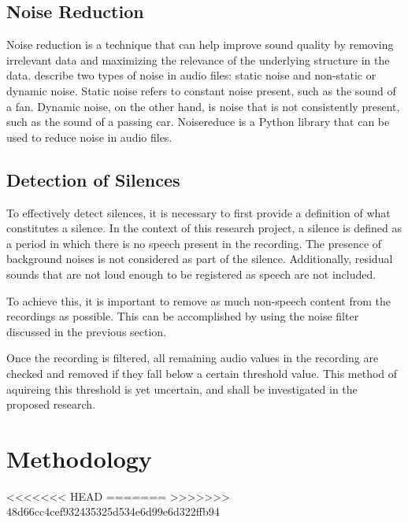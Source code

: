\documentclass[english]{hogent-article}
\begin{document}
\subsection{Noise Reduction}
Noise reduction is a technique that can help improve sound quality by removing irrelevant data and maximizing the relevance of the underlying structure in the data.
\cite{Sainburg_2021} describe two types of noise in audio files: static noise and non-static or dynamic noise.
Static noise refers to constant noise present, such as the sound of a fan.
Dynamic noise, on the other hand, is noise that is not consistently present, such as the sound of a passing car.
Noisereduce \autocite{Sainburg2022} is a Python library that can be used to reduce noise in audio files.

\subsection{Detection of Silences}
\label{subsec:detection-of-silences}

To effectively detect silences, it is necessary to first provide a definition of what constitutes a silence.
In the context of this research project, a silence is defined as a period in which there is no speech present in the recording.
The presence of background noises is not considered as part of the silence.
Additionally, residual sounds that are not loud enough to be registered as speech are not included.

\medskip

To achieve this, it is important to remove as much non-speech content from the recordings as possible.
This can be accomplished by using the noise filter discussed in the previous section.

\medskip

Once the recording is filtered, all remaining audio values in the recording are checked and removed if they fall below a certain threshold value.
This method of aquireing this threshold is yet uncertain, and shall be investigated in the proposed research.

\section{Methodology}%
\label{sec:methodology}

<<<<<<< HEAD
=======
>>>>>>> 48d66cc4cef932435325d534e6d99e6d322ffb94
\end{document}
